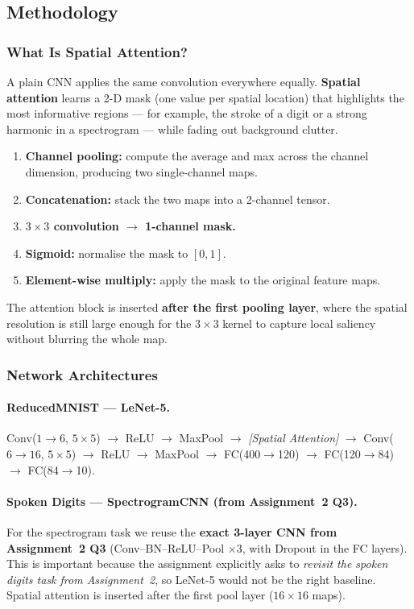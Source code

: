 \documentclass[12pt, a4paper]{article}
\begin{document}
\subsection{Methodology}

\subsubsection{What Is Spatial Attention?}

A plain CNN applies the same convolution everywhere equally.
\textbf{Spatial attention} learns a 2-D mask (one value per spatial location) that
highlights the most informative regions --- for example, the stroke of a digit or
a strong harmonic in a spectrogram --- while fading out background clutter.

\begin{enumerate}
    \item \textbf{Channel pooling:} compute the average and max across the channel
          dimension, producing two single-channel maps.
    \item \textbf{Concatenation:} stack the two maps into a 2-channel tensor.
    \item \textbf{$3\times3$ convolution $\to$ 1-channel mask.}
    \item \textbf{Sigmoid:} normalise the mask to $[0, 1]$.
    \item \textbf{Element-wise multiply:} apply the mask to the original feature maps.
\end{enumerate}

The attention block is inserted \textbf{after the first pooling layer}, where the
spatial resolution is still large enough for the $3\times3$ kernel to capture local
saliency without blurring the whole map.

\subsubsection{Network Architectures}

\paragraph{ReducedMNIST --- LeNet-5.}
Conv($1 \to 6$, $5\!\times\!5$) $\to$ ReLU $\to$ MaxPool $\to$
\emph{[Spatial Attention]} $\to$
Conv($6 \to 16$, $5\!\times\!5$) $\to$ ReLU $\to$ MaxPool $\to$
FC(400$\to$120) $\to$ FC(120$\to$84) $\to$ FC(84$\to$10).

\paragraph{Spoken Digits --- SpectrogramCNN (from Assignment~2 Q3).}
For the spectrogram task we reuse the \textbf{exact 3-layer CNN from Assignment~2 Q3}
(Conv--BN--ReLU--Pool $\times 3$, with Dropout in the FC layers).
This is important because the assignment explicitly asks to \emph{revisit the spoken
digits task from Assignment~2}, so LeNet-5 would not be the right baseline.
Spatial attention is inserted after the first pool layer ($16 \times 16$ maps).
\end{document}
